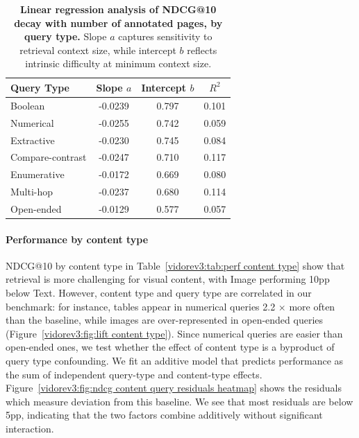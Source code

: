 \begin{table}[htbp]
\centering
\small
\begin{tabular}{lccc}
\toprule
\textbf{Query Type} & Slope $a$ & Intercept $b$ & $R^2$ \\
\midrule
Boolean           & -0.0239 & 0.797 & 0.101 \\
Numerical         & -0.0255 & 0.742 & 0.059 \\
Extractive        & -0.0230 & 0.745 & 0.084 \\
Compare-contrast  & -0.0247 & 0.710 & 0.117 \\
Enumerative       & -0.0172 & 0.669 & 0.080 \\
Multi-hop         & -0.0237 & 0.680 & 0.114 \\
Open-ended        & -0.0129 & 0.577 & 0.057 \\
\bottomrule
\end{tabular}
\caption[Regression of performance decay vs. evidence spread]{\textbf{Linear regression analysis of NDCG@10 decay with number of annotated pages, by query type.} Slope $a$ captures sensitivity to retrieval context size, while intercept $b$ reflects intrinsic difficulty at minimum context size.}
\label{vidorev3:tab:num pages content type decay}
\end{table}

\paragraph{Performance by content type}

NDCG@10 by content type in Table~\ref{vidorev3:tab:perf content type} show that retrieval is more challenging for visual content, with Image performing 10pp below Text. However, content type and query type are correlated in our benchmark: for instance, tables appear in numerical queries 2.2 $\times$ more often than the baseline, while images are over-represented in open-ended queries (Figure~\ref{vidorev3:fig:lift content type}). Since numerical queries are easier than open-ended ones, we test whether the effect of content type is a byproduct of query type confounding. We fit an additive model that predicts performance as the sum of independent query-type and content-type effects. Figure~\ref{vidorev3:fig:ndcg content query residuals heatmap} shows the residuals which measure deviation from this baseline. We see that most residuals are below 5pp, indicating that the two factors combine additively without significant interaction.


